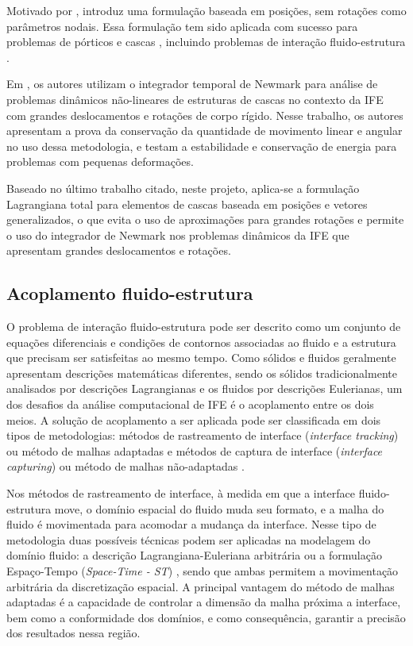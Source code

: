 \documentclass[tese_patricia.tex]{subfiles}
\begin{document}
Motivado por ,  introduz uma formulação baseada em posições, sem rotações como parâmetros nodais. Essa formulação tem sido aplicada com sucesso para problemas de pórticos e cascas \cite{CodaG:2004,CodaP:2010,CarrazedoC:2010,CodaP:2011,SanchesC:2016}, incluindo problemas de interação fluido-estrutura \cite{SanchesC:2013,SanchesC:2014,FernandesCS:2019,AvanciniS:2020}.

Em , os autores utilizam o integrador temporal de Newmark para análise de problemas dinâmicos não-lineares de estruturas de cascas no contexto da IFE com grandes deslocamentos e rotações de corpo rígido. Nesse trabalho, os autores apresentam a prova da conservação da quantidade de movimento linear e angular no uso dessa metodologia, e testam a estabilidade e conservação de energia para problemas com pequenas deformações. 

Baseado no último trabalho citado, neste projeto, aplica-se a formulação Lagrangiana total para elementos de cascas baseada em posições e vetores generalizados, o que evita o uso de aproximações para grandes rotações e permite o uso do integrador de Newmark nos problemas dinâmicos da IFE que apresentam grandes deslocamentos e rotações.

\subsection{Acoplamento fluido-estrutura}
\label{couplingsection}


O problema de interação fluido-estrutura pode ser descrito como um conjunto de equações diferenciais e condições de contornos associadas ao fluido e a estrutura que precisam ser satisfeitas ao mesmo tempo. Como sólidos e fluidos geralmente apresentam descrições matemáticas diferentes, sendo os sólidos tradicionalmente analisados por descrições Lagrangianas e os fluidos por descrições Eulerianas, um dos desafios da análise computacional de IFE é o acoplamento entre os dois meios. A solução de acoplamento a ser aplicada pode ser classificada em dois tipos de metodologias: métodos de rastreamento de interface (\textit{interface tracking}) ou método de malhas adaptadas e métodos de captura de interface (\textit{interface capturing}) ou método de malhas não-adaptadas \cite{Houetal:2012,BazilevsTT:2013b}.

Nos métodos de rastreamento de interface, à medida em que a interface fluido-estrutura move, o domínio espacial do fluido muda seu formato, e a malha do fluido é movimentada para acomodar a mudança da interface. Nesse tipo de metodologia duas possíveis técnicas podem ser aplicadas na modelagem do domínio fluido: a descrição Lagrangiana-Euleriana arbitrária \cite{HughesLZ:1981,DoneaGH:1982,KanchiM:2007} ou a formulação Espaço-Tempo (\textit{Space-Time - ST}) \cite{TezduyarBL:1992b,TezduyarBML:1992c,TakizawaT:2012}, sendo que ambas permitem a movimentação arbitrária da discretização espacial. A principal vantagem do método de malhas adaptadas é a capacidade de controlar a dimensão da malha próxima a interface, bem como a conformidade dos domínios, e como consequência, garantir a precisão dos resultados nessa região.
\end{document}
